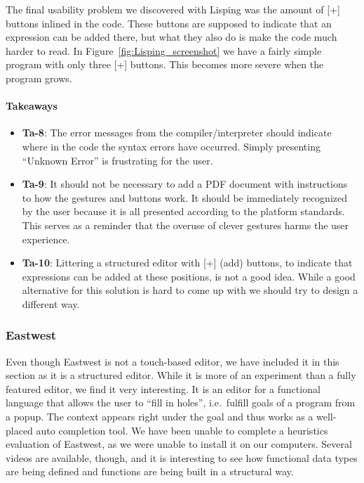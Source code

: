 The final usability problem we discovered with Lisping was the amount of [+] buttons inlined in the code. These buttons are supposed to indicate that an expression can be added there, but what they also do is make the code much harder to read.
In Figure~\ref{fig:Lisping_screenshot} we have a fairly simple program with
only three [+] buttons. This becomes more severe when the program grows.

\paragraph{Takeaways}
\begin{itemize}
	\item \textbf{Ta-8}: The error messages from the compiler/interpreter should indicate where in the code the syntax errors have occurred. Simply presenting ``Unknown Error'' is frustrating for the user.
	\item \textbf{Ta-9}: It should not be necessary to add a PDF document with instructions to how the gestures and buttons work. It should be immediately recognized by the user because it is all presented according to the platform standards. This serves as a reminder that the overuse of clever gestures harms the user experience.
	\item \textbf{Ta-10}: Littering a structured editor with [+] (add) buttons, to indicate that expressions can be added at these positions, is not a good idea. While a good alternative for this solution is hard to come up with we should try to design a different way.
\end{itemize}

\subsubsection{Eastwest}
\label{subsub:Eastwest}
Even though Eastwest is not a touch-based editor, we have included it in this section as it is a structured editor. 
While it is more of an experiment than a fully featured editor, we find it very interesting. It is an editor for a functional language that allows the user to ``fill in holes'', i.e.\ fulfill goals of a program from a popup. The context appears right under the goal and thus works as a well-placed auto completion tool. We have been unable to complete a heuristics evaluation of Eastwest, as we were unable to install it on our computers. Several videos are available, though, and it is interesting to see how functional data types are being defined and functions are being built in a structural way.

